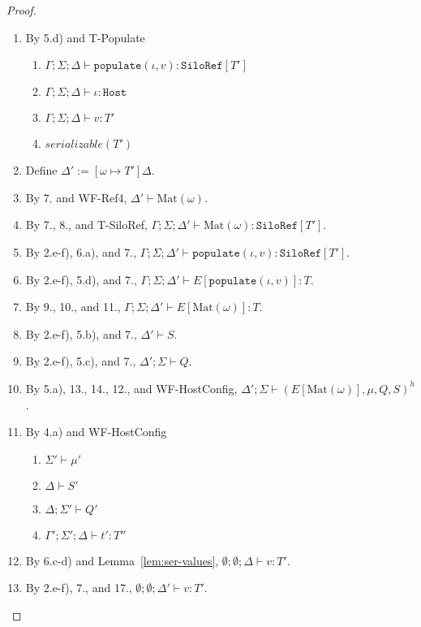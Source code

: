 \begin{proof}
\begin{itemize}
\begin{enumerate}
\begin{enumerate}[label=(\alph*)]
  \end{enumerate}
\item By 5.d) and T-Populate
  \begin{enumerate}[label=(\alph*)]
  \item $\Gamma ; \Sigma ; \Delta \vdash \texttt{populate}(\iota, v) : \texttt{SiloRef}[T']$
  \item $\Gamma ; \Sigma ; \Delta \vdash \iota : \texttt{Host}$
  \item $\Gamma ; \Sigma ; \Delta \vdash v : T'$
  \item $serializable(T')$
  \end{enumerate}
\item Define $\Delta' := [\omega \mapsto T']\Delta$.
\item By 7. and WF-Ref4, $\Delta' \vdash \text{Mat}(\omega)$.
\item By 7., 8., and T-SiloRef, $\Gamma ; \Sigma ; \Delta' \vdash \text{Mat}(\omega) : \texttt{SiloRef}[T']$.
\item By 2.e-f), 6.a), and 7., $\Gamma ; \Sigma ; \Delta' \vdash \texttt{populate}(\iota, v) : \texttt{SiloRef}[T']$.
\item By 2.e-f), 5.d), and 7., $\Gamma ; \Sigma ; \Delta' \vdash E[\texttt{populate}(\iota, v)] : T$.
\item By 9., 10., and 11., $\Gamma ; \Sigma ; \Delta' \vdash E[\text{Mat}(\omega)] : T$.
\item By 2.e-f), 5.b), and 7., $\Delta' \vdash S$.
\item By 2.e-f), 5.c), and 7., $\Delta' ; \Sigma \vdash Q$.
\item By 5.a), 13., 14., 12., and WF-HostConfig, $\Delta' ; \Sigma \vdash (E[\text{Mat}(\omega)], \mu, Q, S)^h$.
\item By 4.a) and WF-HostConfig
  \begin{enumerate}[label=(\alph*)]
  \item $\Sigma' \vdash \mu'$
  \item $\Delta \vdash S'$
  \item $\Delta ; \Sigma' \vdash Q'$
  \item $\Gamma' ; \Sigma' ; \Delta \vdash t' : T''$
  \end{enumerate}
\item By 6.c-d) and Lemma~\ref{lem:ser-values}, $\emptyset ; \emptyset ; \Delta \vdash v : T'$.
\item By 2.e-f), 7., and 17., $\emptyset ; \emptyset ; \Delta' \vdash v : T'$.

\end{enumerate}
\end{itemize}
\end{proof}
